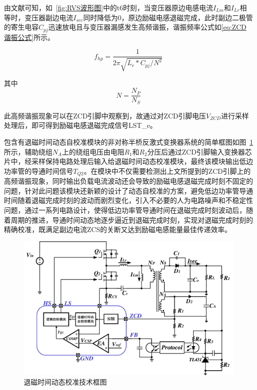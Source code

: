 由文献可知，如~\ref{fig:RVS波形图}中的t6时刻，当变压器原边电感电流$I_{Lm}$和$I_{Lr}$相等时，变压器副边电流$I_{sec}$同时降低为0，原边励磁电感退磁完成，此时副边二极管的寄生电容$C_{pj}$迅速放电且与变压器漏感发生高频谐振，谐振频率公式如\eqref{eq:ZCD谐振公式}所示。

\begin{equation}
    \label{eq:ZCD谐振公式}
    f_{hp} = \frac{1}{2\pi \sqrt{L_r * C_{pj}/N^2}}
\end{equation}

其中 
\begin{equation}
    \label{eq:变压器匝比}
    N=\frac{N_P}{N_S}
\end{equation}

此高频谐振现象可以在ZCD引脚中观察到，故通过对ZCD引脚电压$V_{ZCD}$进行采样处理后，即可得到励磁电感退磁完成信号LST\_e。

包含有退磁时间动态自校准模块的非对称半桥反激式变换器系统的简单框图如图~\ref{fig:退磁时间1}所示，辅助绕组$N_A$上的绕组电压由电阻$R_1$和$R_2$分压后通过ZCD引脚输入变换器芯片中，经采样保持电路处理后输入给退磁时间动态校准模块，最终该模块输出低边功率管的导通时间信号$T_{Q2}$。在模块中不仅需要检测出上文所提到的ZCD引脚上的高频谐振现象，同时输出负载电流波动还会导致的励磁电感退磁完成时刻不固定的问题，针对此问题该模块还新颖的设计了动态自校准的方案，避免低边功率管导通时间随着退磁完成时刻的波动而剧烈变化，引入不必要的人为电路噪声和不稳定性问题，通过一系列电路设计，使得低边功率管导通时间在退磁完成时刻波动后，随着周期的推进，导通时间动态地逐步逼近到退磁完成时刻，实现对退磁完成时刻的精确校准，既满足副边电流ZCS的关断又达到励磁电感能量最佳传递效率。

\begin{figure}[htbp] 
    \centering
    \includegraphics[width=0.8\linewidth]{figures/退磁时间动态校准图.pdf}
    \caption{退磁时间动态校准技术框图}
    \label{fig:退磁时间1}
\end{figure}



